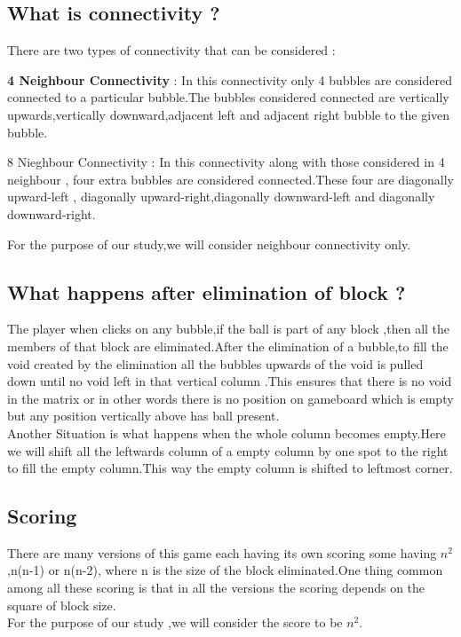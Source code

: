 \documentclass[twoside]{article}
\begin{document}
\begin{multicols}{2}
\subsection{What is connectivity ?}
There are two types of connectivity that can be considered :
\begin{compactitem}
\item \textbf{4 Neighbour Connectivity} : In this connectivity only 4 bubbles are considered connected to a particular bubble.The bubbles  considered  connected are vertically upwards,vertically downward,adjacent left and adjacent right bubble to the given bubble.
\item 8 Nieghbour Connectivity : In this connectivity along with those considered in 4 neighbour , four extra bubbles are considered connected.These four are diagonally upward-left , diagonally upward-right,diagonally downward-left and diagonally downward-right.\\
\end{compactitem}
For the purpose of our study,we will consider  neighbour connectivity only.
\subsection{What happens after elimination of block ?}
The player when clicks on any bubble,if the ball is part of any block ,then all the members of that block are eliminated.After the elimination of a bubble,to fill the void created by the elimination all the bubbles upwards of the void is  pulled down until no void left in that vertical column .This ensures that there is no void in the matrix or in other words there is no position on gameboard which is empty but any position vertically above has ball present.\\
Another Situation is what happens when the whole column becomes empty.Here we will shift all the leftwards column of a empty column by one spot to the right to fill the empty column.This way the empty column is shifted to leftmost corner.\\
\subsection{Scoring}
There are many versions of this game each having its own scoring some having $n^2$ ,n(n-1) or n(n-2), where n is the size of the block eliminated.One thing common among all these scoring is that in all the versions the scoring depends on the square of block size.\\
For the purpose of our study ,we will consider the score to be $n^2$.\\


\end{multicols}
\end{document}
